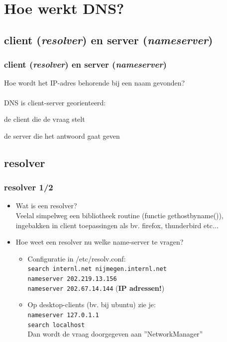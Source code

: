 \section{Hoe werkt DNS?}
\subsection{client ({\it resolver}) en server ({\it nameserver})}
\begin{styleframe}
	\frametitle{client ({\it resolver}) en server ({\it nameserver})}
Hoe wordt het IP-adres behorende bij een naam gevonden?\\
~\\
DNS is client-server georienteerd:
\begin{description}[nameserverxx]
	\item[resolver] de client die de vraag stelt
	\item[nameserver] de server die het antwoord gaat geven
\end{description}
\end{styleframe}

\subsection{resolver}
\begin{styleframefrag}
	\frametitle{resolver 1/2}
\begin{itemize}
\item Wat is een resolver?\\
\pause
Veelal simpelweg een bibliotheek routine (functie gethostbyname()), ingebakken in client toepassingen als bv. firefox, thunderbird etc...\\
\pause
\item Hoe weet een resolver nu welke name-server te vragen?\\
	\begin{itemize}
	\item Configuratie in /etc/resolv.conf:\\
{\tt search internl.net nijmegen.internl.net\\
nameserver 202.219.13.156\\ 
nameserver 202.67.14.144}
\pause ({\bf IP adressen!})\\
\pause
	\item Op desktop-clients (bv. bij ubuntu) zie je:\\
{\tt nameserver 127.0.1.1\\
search localhost\\}
Dan wordt de vraag doorgegeven aan ''NetworkManager''\\
	\end{itemize}
\end{itemize}
\end{styleframefrag}


